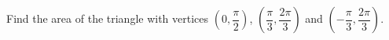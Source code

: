 Find the area of the triangle with vertices $\left(0,\dfrac{\pi}{2}\right)$, $\left(\dfrac{\pi}{3},\dfrac{2\pi}{3}\right)$ and $\left(-\dfrac{\pi}{3},\dfrac{2\pi}{3}\right)$.
